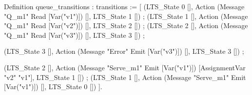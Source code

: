 Definition queue_transitions : transitions :=
 [ (LTS_State 0 [], Action (Message "Q_m1" Read [Var("v1")]) [], LTS_State 1 []) ;
   (LTS_State 1 [], Action (Message "Q_m1" Read [Var("v2")]) [], LTS_State 2 []) ;
   (LTS_State 2 [], Action (Message "Q_m1" Read [Var("v3")]) [], LTS_State 3 []) ;
   
   (LTS_State 3 [], Action (Message "Error" Emit [Var("v3")]) [], LTS_State 3 []) ;
   
   (LTS_State 2 [], Action (Message "Serve_m1" Emit [Var("v1")]) [AssignmentVar "v2" "v1"], LTS_State 1 []) ;
   (LTS_State 1 [], Action (Message "Serve_m1" Emit [Var("v1")]) [], LTS_State 0 [])
 ].